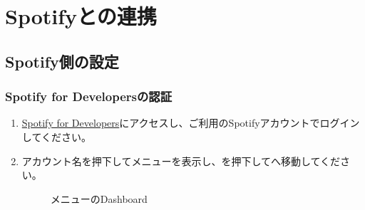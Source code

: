 \section{Spotifyとの連携 }
\label{sec:spotify1}
    \subsection{Spotify側の設定}
    \label{sec:spotify2}
        \subsubsection{Spotify for Developersの認証 }
        \label{sec:spotify3}
            \begin{enumerate}
                \item \href{https://developer.spotify.com}{Spotify for Developers}にアクセスし、ご利用のSpotifyアカウントでログインしてください。
                \label{item:spotify1}
                \item アカウント名を押下してメニューを表示し、を押下して\spotifydashboard へ移動してください。
                \label{item:spotify2}
                    \begin{figure}[htbp]
                        \centering
                        \caption{メニューのDashboard}
                        \label{img:spotify1}
                    \end{figure}


\end{enumerate}

